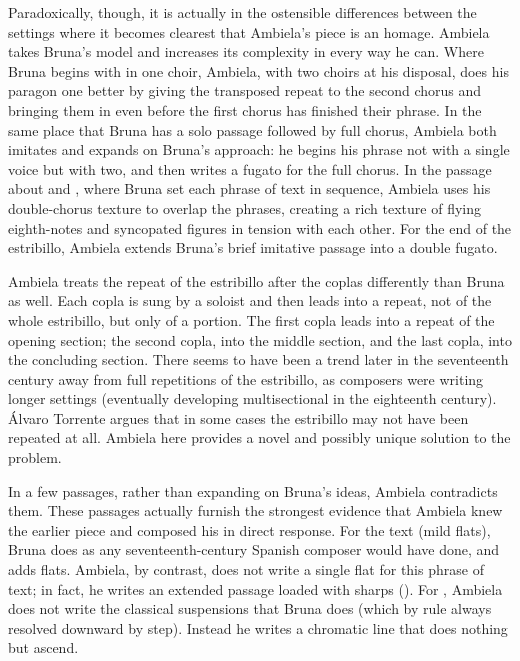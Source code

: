 Paradoxically, though, it is actually in the ostensible differences between the
settings where it becomes clearest that Ambiela's piece is an homage.
Ambiela takes Bruna's model and increases its complexity in every way he can.
Where Bruna begins with  in one choir, Ambiela, with two choirs
at his disposal, does his paragon one better by giving the transposed repeat to
the second chorus and bringing them in even before the first chorus has
finished their phrase.
In the same place that Bruna has a solo passage followed by full chorus,
Ambiela both imitates and expands on Bruna's approach: he begins his phrase not
with a single voice but with two, and then writes a fugato for the full chorus.
In the passage about  and , where Bruna set
each phrase of text in sequence, Ambiela uses his double-chorus texture to
overlap the phrases, creating a rich texture of flying eighth-notes and
syncopated figures in tension with each other.
For the end of the estribillo, Ambiela extends Bruna's brief imitative passage
into a double fugato.

Ambiela treats the repeat of the estribillo after the coplas differently than
Bruna as well.
Each copla is sung by a soloist and then leads into a repeat, not of the whole
estribillo, but only of a portion.
The first copla leads into a repeat of the opening section; the second copla,
into the middle section, and the last copla, into the concluding section.
There seems to have been a trend later in the seventeenth century away from
full repetitions of the estribillo, as composers were writing longer settings
(eventually developing multisectional  in the eighteenth
century).
Álvaro Torrente argues that in some cases the estribillo may not have been
repeated at all.%
    \Autocite{Torrente:Estribillo}
Ambiela here provides a novel and possibly unique solution to the problem.

In a few passages, rather than expanding on Bruna's ideas, Ambiela contradicts
them.
These passages actually furnish the strongest evidence that Ambiela knew the
earlier piece and composed his in direct response.
For the text  (mild flats), Bruna does as any
seventeenth-century Spanish composer would have done, and adds flats.
Ambiela, by contrast, does not write a single flat for this phrase of text; in
fact, he writes an extended passage loaded with sharps
().
For , Ambiela does not write the classical
suspensions that Bruna does (which by rule always resolved downward by step).
Instead he writes a chromatic line that does nothing but ascend.


